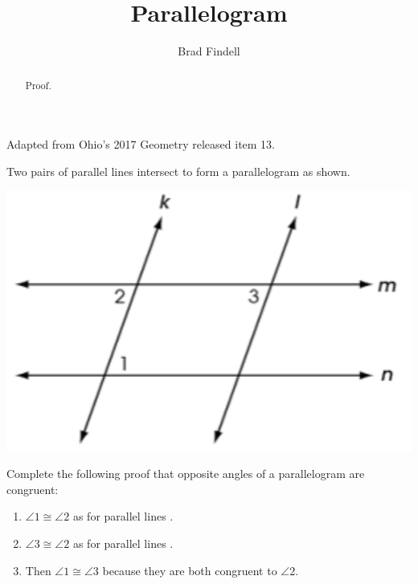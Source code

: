 \documentclass[nooutcomes]{ximera}
\title{Parallelogram}
\author{Brad Findell}
\begin{document}
\begin{abstract}
Proof. 
\end{abstract}
\maketitle


\begin{problem}
Adapted from Ohio's 2017 Geometry released item 13. 

Two pairs of parallel lines intersect to form a parallelogram as shown.  
\begin{image}
\includegraphics{Q13.png}
\end{image}
Complete the following proof that opposite angles of a parallelogram are congruent: 

\begin{enumerate}
\item $\angle 1 \cong \angle 2$ as 
for parallel lines .
\item $\angle 3 \cong \angle 2$ as for parallel lines .
\item Then $\angle 1 \cong \angle 3$ because they are both congruent 
to $\angle 2$. 
\end{enumerate}
\end{problem}
\end{document}
